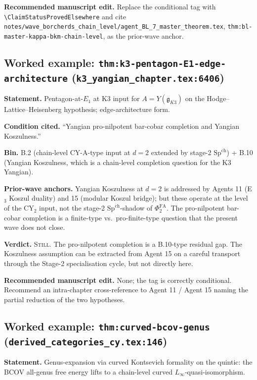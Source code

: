 \documentclass[11pt]{amsart}
\providecommand{\PhiFA}{\Phi^{\mathrm{FA}}}
\providecommand{\SpCh}{\mathrm{Sp}^{\mathrm{ch}}}
\providecommand{\fg}{\mathfrak{g}}
\begin{document}
{{\textbf{Recommended manuscript edit.} Replace the conditional tag
with \texttt{\textbackslash ClaimStatusProvedElsewhere} and cite
\texttt{notes/wave\_borcherds\_chain\_level/agent\_BL\_7\_master\_theorem.tex},
\texttt{thm:bl-master-kappa-bkm-chain-level}, as the prior-wave anchor.

\subsection{Worked example: \texttt{thm:k3-pentagon-E1-edge-architecture} (\texttt{k3\_yangian\_chapter.tex:6406})}

\textbf{Statement.} Pentagon-at-$E_1$ at K3 input for
$A = Y(\fg_{K3})$ on the Hodge--Lattice--Heisenberg hypothesis;
edge-architecture form.

\textbf{Condition cited.} ``Yangian pro-nilpotent bar-cobar completion
and Yangian Koszulness.''

\textbf{Bin.} B.2 (chain-level CY-A-type input at $d = 2$
extended by stage-2 $\SpCh$) + B.10 (Yangian Koszulness, which is a
chain-level completion question for the K3 Yangian).

\textbf{Prior-wave anchors.} Yangian Koszulness at $d = 2$ is addressed
by Agents 11 (E$_3$ Koszul duality) and 15 (modular Koszul bridge);
but these operate at the level of the CY$_2$ input, not the stage-2
$\SpCh$-shadow of $\PhiFA_2$. The pro-nilpotent bar-cobar completion
is a finite-type vs.\ pro-finite-type question that the present wave
does not close.

\textbf{Verdict.} \textsc{Still}. The pro-nilpotent completion
is a B.10-type residual gap. The Koszulness assumption can be
extracted from Agent 15 on a careful transport through the Stage-2
specialisation cycle, but not directly here.

\textbf{Recommended manuscript edit.} None; the tag is correctly
conditional. Recommend an intra-chapter cross-reference to Agent 11 /
Agent 15 naming the partial reduction of the two hypotheses.

\subsection{Worked example: \texttt{thm:curved-bcov-genus} (\texttt{derived\_categories\_cy.tex:146})}

\textbf{Statement.} Genus-expansion via curved Kontsevich formality
on the quintic: the BCOV all-genus free energy lifts to a chain-level
curved $L_\infty$-quasi-isomorphism.

}}
\end{document}

